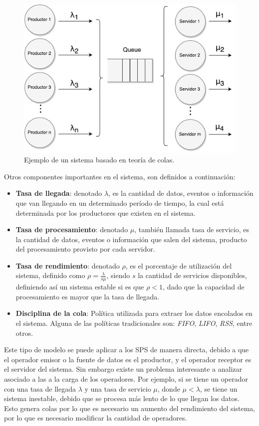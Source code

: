 \begin{figure}[!ht]
	\centering
	\includegraphics[scale=0.6]{images/TeoriaColas.pdf}
	\caption{Ejemplo de un sistema basado en teor\'ia de colas.}
	\label{fig:teoriaColas}
\end{figure}

Otros componentes importantes en el sistema, son definidos a continuaci\'on:
\begin{itemize}
	\item \textbf{Tasa de llegada}: denotado $\lambda$, es la cantidad de datos, eventos o informaci\'on que van llegando en un determinado per\'iodo de tiempo, la cual est\'a determinada por los productores que existen en el sistema.
	\item \textbf{Tasa de procesamiento}: denotado $\mu$, tambi\'en llamada tasa de servicio, es la cantidad de datos, eventos o informaci\'on que salen del sistema, producto del procesamiento provisto por cada servidor.
	\item \textbf{Tasa de rendimiento}: denotado $\rho$, es el porcentaje de utilizaci\'on del sistema, definido como $\rho = \frac{\lambda}{s\mu}$, siendo $s$ la cantidad de servicios disponibles, definiendo as\'i un sistema estable si es que $\rho < 1$, dado que la capacidad de procesamiento es mayor que la tasa de llegada.
	\item \textbf{Disciplina de la cola}: Pol\'itica utilizada para extraer los datos encolados en el sistema. Alguna de las pol\'iticas tradicionales son: \textit{FIFO}, \textit{LIFO}, \textit{RSS}, entre otros.
\end{itemize}

Este tipo de modelo se puede aplicar a los SPS de manera directa, debido a que el operador emisor o la fuente de datos es el productor, y el operador receptor es el servidor del sistema. Sin embargo existe un problema interesante a analizar asociado a las a la carga de los operadores. Por ejemplo, si se tiene un operador con una tasa de llegada $\lambda$ y una tasa de servicio $\mu$, donde $\mu < \lambda$, se tiene un sistema inestable, debido que se procesa m\'as lento de lo que llegan los datos. Esto genera colas por lo que es necesario un aumento del rendimiento del sistema, por lo que es necesario modificar la cantidad de operadores.